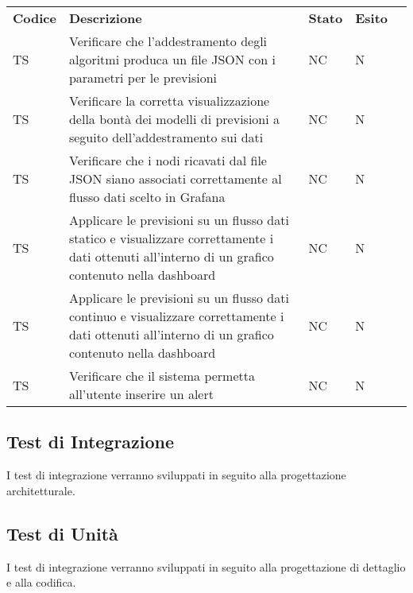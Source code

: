\begin{longtable} {
		>{\centering}p{15mm} 
		>{\centering}p{79.5mm}
		>{\centering}p{10mm} 
		>{\centering}p{10mm}
		>{}p{0mm}}
	\rowcolor{gray!50}
	\textbf{Codice} & \textbf{Descrizione} & \textbf{Stato} & \textbf{Esito} &\TBstrut \\
	TS & Verificare che l'addestramento degli algoritmi produca un file JSON con i parametri per le previsioni & NC & N  &\TBstrut \\ [2mm]
	TS & Verificare la corretta visualizzazione della bontà dei modelli di previsioni a seguito dell'addestramento sui dati & NC & N  &\TBstrut \\ [2mm]
	TS & Verificare che i nodi ricavati dal file JSON siano associati correttamente al flusso dati scelto in Grafana\glo & NC & N  &\TBstrut \\ [2mm]
	TS & Applicare le previsioni su un flusso dati statico e visualizzare correttamente i dati ottenuti all'interno di un grafico contenuto nella dashboard\glo & NC & N  &\TBstrut \\ [2mm]
	TS & Applicare le previsioni su un flusso dati continuo e visualizzare correttamente i dati ottenuti all'interno di un grafico contenuto nella dashboard\glo & NC & N  &\TBstrut \\ [2mm]
	TS & Verificare che il sistema permetta all'utente inserire un alert\glo & NC & N  &\TBstrut \\ [2mm]
	
\end{longtable}


\subsection{Test di Integrazione}
I test di integrazione verranno sviluppati in seguito alla progettazione architetturale.

\subsection{Test di Unità}
I test di integrazione verranno sviluppati in seguito alla progettazione di dettaglio e alla codifica.
